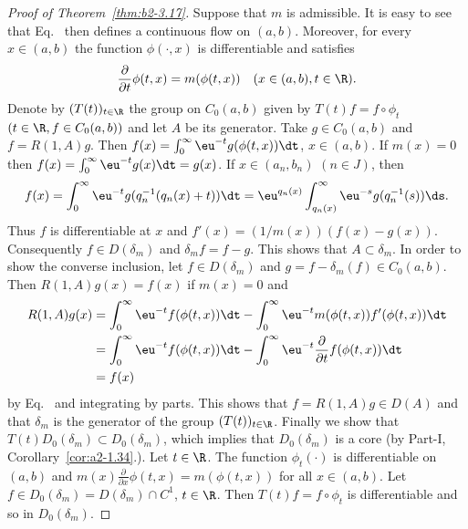 \begin{proof}[Proof of Theorem~\ref{thm:b2-3.17}]
Suppose that $m$ is admissible.
It is easy to see that Eq.~ then defines a continuous flow on $(a,b)$.
Moreover, for every $x \in (a,b)$ the function $\phi(\cdot,x)$ is differentiable and satisfies
\begin{equation}\label{eq:b2-3.23}
\frac{\partial}{\partial t}\phi(t,x) = m(\phi(t,x)) \quad (x \in (a,b), t \in \R).
\end{equation}
Denote by $(T(t))_{t \in \R}$ the group on $C_{0}(a,b)$ given by $T(t)f = f \circ \phi_{t}$ $(t \in \R, f \in C_{0}(a,b))$ and let $A$ be its generator.
Take $g \in C_{0}(a,b)$ and $f = R(1,A)g$.
Then $f(x) = \int_{0}^{\infty} \eu^{-t}g(\phi(t,x)) \dt$, $x \in (a,b)$.
If\/ $m(x) = 0$ then $f(x) = \int_{0}^{\infty} \eu^{-t}g(x) \dt = g(x)$.
If\/ $x \in (a_{n},b_{n})$ $(n \in J)$, then 
\[
f(x) = \int_{0}^{\infty} \eu^{-t}g(q_{n}^{-1}(q_{n}(x) + t)) \dt = \eu^{q_{n}(x)} \int_{q_{n}(x)}^{\infty} \eu^{-s}g(q_{n}^{-1}(s)) \ds.
\]
Thus $f$ is differentiable at $x$ and $f'(x) = (1/m(x))(f(x) - g(x))$.
Consequently $f \in D(\delta_{m})$ and $\delta_{m}f = f - g$.
This shows that $A \subset \delta_{m}$.
In order to show the converse inclusion, let $f \in D(\delta_{m})$ and $g = f - \delta_{m}(f) \in C_{0}(a,b)$.
Then $R(1,A)g(x) = f(x)$ if\/ $m(x) = 0$ and 
\begin{align*}
R(1,A)g(x) &= \int_{0}^{\infty} \eu^{-t}f(\phi(t,x)) \dt - \int_{0}^{\infty} \eu^{-t}m(\phi(t,x))f'(\phi(t,x)) \dt \\
           &= \int_{0}^{\infty} \eu^{-t}f(\phi(t,x)) \dt - \int_{0}^{\infty} \eu^{-t}\frac{\partial}{\partial t}f(\phi(t,x)) \dt 
           \\
           &= f(x) 
\end{align*}
by  Eq.~ and integrating by parts.
This shows that $f = R(1,A)g \in D(A)$ and that $\delta_{m}$ is the generator of the group $(T(t))_{t \in \R}$.
Finally we show that $T(t)D_{0}(\delta_{m}) \subset D_{0}(\delta_{m})$, which implies that $D_{0}(\delta_{m})$ is a core (by Part-I, Corollary~\ref{cor:a2-1.34}.).
Let $t \in \R$.
The function $\phi_{t}(\cdot)$ is
differentiable on $(a,b)$ and $m(x)\frac{\partial}{\partial x}\phi(t,x) = m(\phi(t,x))$ for all $x \in (a,b)$.
Let $f \in D_{0}(\delta_{m}) = D(\delta_{m}) \cap C^{1}$, $t \in \R$.
Then $T(t)f = f \circ \phi_{t}$ is differentiable and so in $D_{0}(\delta_{m})$.


\end{proof}
